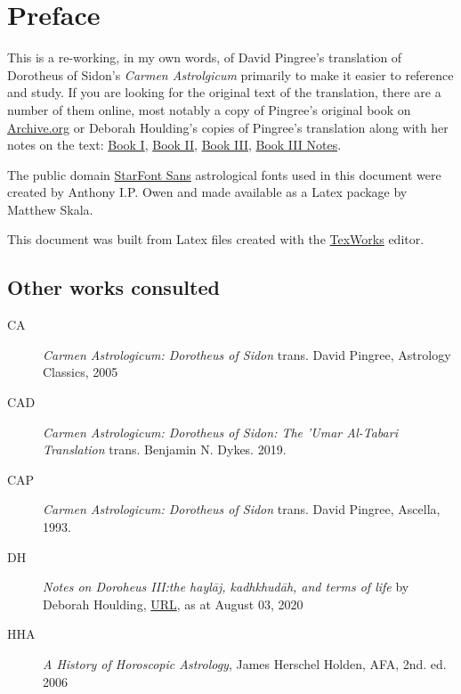 \chapter{Preface}
This is a re-working, in my own words, of David Pingree's translation of Dorotheus of Sidon's \textsl{Carmen Astrolgicum} primarily to make it easier to reference and study. If you are looking for the original text of the translation, there are a number of them online, most notably a copy of Pingree's original book on \href{https://archive.org/details/PingreeDS1976}{Archive.org} or Deborah Houlding's copies of Pingree's translation along with her notes on the text: \href{https://www.skyscript.co.uk/dorotheus1.pdf}{Book I}, \href{https://www.skyscript.co.uk/dorotheus2.pdf}{Book II}, \href{https://www.skyscript.co.uk/dorotheus3.pdf}{Book III}, \href{https://www.skyscript.co.uk/dorotheus3notes.pdf}{Book III Notes}.

The public domain \href{https://www.ctan.org/pkg/starfont}{StarFont Sans} astrological fonts used in this document were created by Anthony I.P. Owen and made available as a Latex package by Matthew Skala. 

This document was built from Latex files created with the \href{https://www.tug.org/texworks/}{TexWorks} editor.

\section{Other works consulted}
\begin{description}
\item[CA]
	\textsl{Carmen Astrologicum: Dorotheus of Sidon} trans. David Pingree, Astrology Classics, 2005

\item[CAD]
	\textsl{Carmen Astrologicum: Dorotheus of Sidon: The 'Umar Al-Tabari Translation} trans. Benjamin N. Dykes. 2019.

\item[CAP]
	\textsl{Carmen Astrologicum: Dorotheus of Sidon} trans. David Pingree, Ascella, 1993.
	
\item[DH]
	\textsl{Notes on Doroheus III:the haylāj, kadhkhudāh, and terms of life} by Deborah Houlding, \href{https://www.skyscript.co.uk/dorotheus3notes.pdf}{URL}, as at August 03, 2020
	
\item[HHA]
	\textsl{A History of Horoscopic Astrology}, James Herschel Holden, AFA, 2nd. ed. 2006
\end{description}

